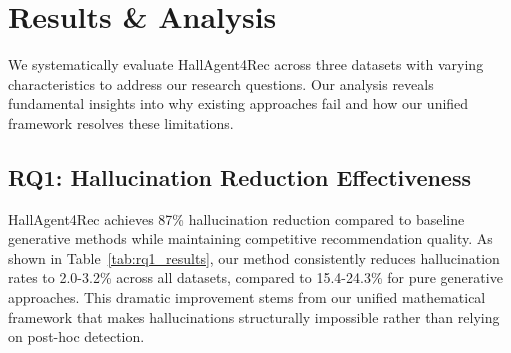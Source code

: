 \documentclass[acmsmall]{acmart}
\begin{document}
\section{Results \& Analysis}
\label{sec:results}

We systematically evaluate HallAgent4Rec across three datasets with varying characteristics to address our research questions. Our analysis reveals fundamental insights into why existing approaches fail and how our unified framework resolves these limitations.

\subsection{RQ1: Hallucination Reduction Effectiveness}

HallAgent4Rec achieves 87\% hallucination reduction compared to baseline generative methods while maintaining competitive recommendation quality. As shown in Table~\ref{tab:rq1_results}, our method consistently reduces hallucination rates to 2.0-3.2\% across all datasets, compared to 15.4-24.3\% for pure generative approaches. This dramatic improvement stems from our unified mathematical framework that makes hallucinations structurally impossible rather than relying on post-hoc detection.
\end{document}
